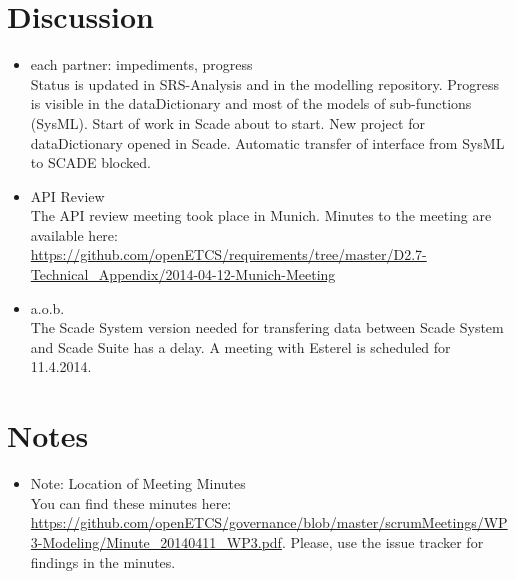 \documentclass[a4paper, 11pt]{article}
\begin{document}
\section{Discussion}
\begin{itemize}
\item each partner: impediments, progress\\
Status is updated in SRS-Analysis and in the modelling repository. Progress is visible in the dataDictionary and most  of the models of sub-functions (SysML). Start of work in Scade about to start. New project for dataDictionary opened in Scade.  Automatic transfer of interface from SysML to SCADE blocked.

\item API Review\\
The API review meeting took place in Munich. Minutes to the meeting are available here: \url{https://github.com/openETCS/requirements/tree/master/D2.7-Technical_Appendix/2014-04-12-Munich-Meeting}

\item a.o.b.\\
The Scade System version needed for transfering data between Scade System and Scade Suite has a delay. A meeting with Esterel is scheduled for 11.4.2014.

\end{itemize}

\section{Notes}
\begin{itemize}

\item Note: Location of Meeting Minutes\\
You can find these minutes here: \url{https://github.com/openETCS/governance/blob/master/scrumMeetings/WP3-Modeling/Minute_20140411_WP3.pdf}. Please, use the issue tracker for findings in the minutes.

\end{itemize}
\end{document}
